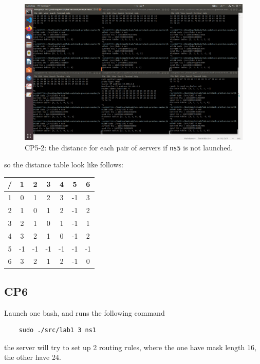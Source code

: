 \documentclass[11pt]{article}
\begin{document}
		\begin{figure}[htbp]
			\centering
			\includegraphics[width=0.9\linewidth]{../lab-netstack-premium-master/checkpoints/CP5-2.png}
			\caption{CP5-2: the distance for each pair of servers if \texttt{ns5} is not launched.}
			\label{fig:CP5-1}
		\end{figure}
		
		\par so the distance table look like follows:
		
		\begin{tabular}{|c|c|c|c|c|c|c|}
			\hline /&1&2&3&4&5&6\\
			\hline 1&0&1&2&3&-1&3\\
			\hline 2&1&0&1&2&-1&2\\
			\hline 3&2&1&0&1&-1&1\\
			\hline 4&3&2&1&0&-1&2\\
			\hline 5&-1&-1&-1&-1&-1&-1\\
			\hline 6&3&2&1&2&-1&0\\
			\hline
		\end{tabular}
	
	\subsection*{CP6}
	
	\par Launch one bash, and runs the following command
	
	\begin{lstlisting}
	sudo ./src/lab1 3 ns1
	\end{lstlisting}
	
	\par the server will try to set up 2 routing rules, where the one have mask length 16, the other have 24.
	
\end{document}
